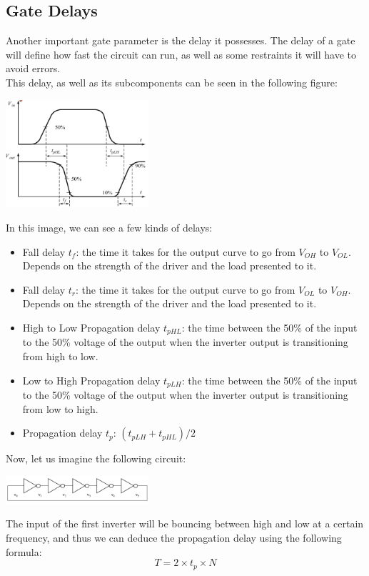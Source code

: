 \documentclass[nobib,fleqn,8pt]{article}
\begin{document}
\subsection{Gate Delays}
Another important gate parameter is the delay it possesses. The delay of a gate
will define how fast the circuit can run, as well as some restraints it will
have to avoid errors.\\ This delay, as well as its subcomponents can be seen in
the following figure:
\begin{center}
    \includegraphics*[width = 200px]{images/inverter_delay_plot.png}
\end{center}
In this image, we can see a few kinds of delays:
\begin{itemize}
    \item Fall delay $t_f$: the time it takes for the output curve to go from $V_{OH}$ to
          $V_{OL}$. Depends on the strength of the driver and the load presented to it.
    \item Fall delay $t_r$: the time it takes for the output curve to go from $V_{OL}$ to
          $V_{OH}$. Depends on the strength of the driver and the load presented to it.
    \item High to Low Propagation delay $t_{pHL}$: the time between the 50\% of the input
          to the 50\% voltage of the output when the inverter output is transitioning
          from high to low.
    \item Low to High Propagation delay $t_{pLH}$: the time between the 50\% of the input
          to the 50\% voltage of the output when the inverter output is transitioning
          from low to high.
    \item Propagation delay $t_p$: $(t_{pLH}+t_{pHL})/2$
\end{itemize}
Now, let us imagine the following circuit:
\begin{center}
    \includegraphics*[width = 200px]{images/inverter_cycle.png}
\end{center}
The input of the first inverter will be bouncing between high and low at a certain frequency, and thus we can deduce the propagation delay using the following formula:
\begin{equation*}
    T = 2 \times t_p \times N
\end{equation*}
\end{document}
